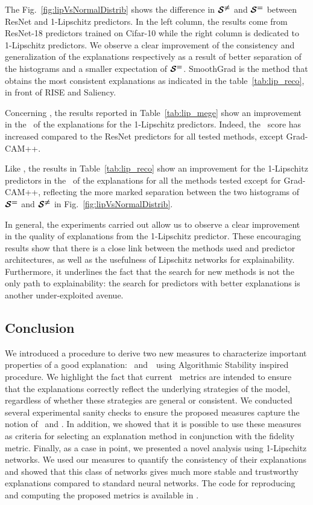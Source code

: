


The Fig.~\ref{fig:lipVsNormalDistrib} shows the difference in $\boldsymbol{\mathcal{S}^{ \ne }}$ and $\boldsymbol{\mathcal{S}^{ = }}$ between ResNet and 1-Lipschitz predictors. In the left column, the results come from ResNet-18 predictors trained on Cifar-10 while the right column is dedicated to 1-Lipschitz predictors. We observe a clear improvement of the consistency and generalization of the explanations respectively as a result of better separation of the histograms and a smaller expectation of $\boldsymbol{\mathcal{S}^{ = }}$. SmoothGrad is the method that obtains the most consistent explanations as indicated in the table~\ref{tab:lip_reco}, in front of RISE and Saliency.

Concerning \mege, the results reported in Table~\ref{tab:lip_mege} show an improvement in the \representativity~of the explanations for the 1-Lipschitz predictors. Indeed, the \representativity~score has increased compared to the ResNet predictors for all tested methods, except Grad-CAM++. 


Like \mege, the results in Table~\ref{tab:lip_reco} show an improvement for the 1-Lipschitz predictors in the \consistency~of the explanations for all the methods tested except for Grad-CAM++, reflecting the more marked separation between the two histograms of $\boldsymbol{\mathcal{S}^{ = }}$ and $\boldsymbol{\mathcal{S}^{ \ne }}$ in Fig.~\ref{fig:lipVsNormalDistrib}.


In general, the experiments carried out allow us to observe a clear improvement in the quality of explanations from the 1-Lipschitz predictor.
These encouraging results show that there is a close link between the methods used and predictor architectures, as well as the usefulness of Lipschitz networks for explainability.
Furthermore, it underlines the fact that the search for new methods is not the only path to explainability: the search for predictors with better explanations is another under-exploited avenue. 

\subsection{Conclusion}

We introduced a procedure to derive two new measures to characterize important properties of a good explanation: \representativity~and~\consistency~using Algorithmic Stability inspired procedure.
We highlight the fact that current \fidelity~metrics are intended to ensure that the explanations correctly reflect the underlying strategies of the model, regardless of whether these strategies are general or consistent.
We conducted several experimental sanity checks to ensure the proposed measures capture the notion of \representativity~and \consistency.
In addition, we showed that it is possible to use these measures as criteria for selecting an explanation method in conjunction with the fidelity metric.
Finally, as a case in point, we presented a novel analysis using 1-Lipschitz networks. We  used our measures to quantify the consistency of their explanations and showed that this class of networks gives much more stable and trustworthy explanations compared to standard neural networks. The code for reproducing and computing the proposed metrics is available in \xplique.
